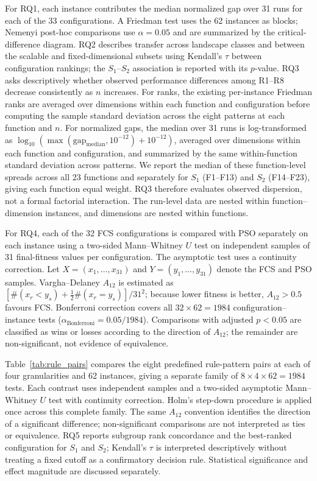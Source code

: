For RQ1, each instance contributes the median normalized gap over 31 runs for each of the 33 configurations. A Friedman test uses the 62 instances as blocks; Nemenyi post-hoc comparisons use $\alpha=0.05$ and are summarized by the critical-difference diagram. RQ2 describes transfer across landscape classes and between the scalable and fixed-dimensional subsets using Kendall's $\tau$ between configuration rankings; the $S_1$--$S_2$ association is reported with its $p$-value. RQ3 asks descriptively whether observed performance differences among R1--R8 decrease consistently as $n$ increases. For ranks, the existing per-instance Friedman ranks are averaged over dimensions within each function and configuration before computing the sample standard deviation across the eight patterns at each function and $n$. For normalized gaps, the median over 31 runs is log-transformed as $\log_{10}(\max(\text{gap}_{\mathrm{median}},10^{-12})+10^{-12})$, averaged over dimensions within each function and configuration, and summarized by the same within-function standard deviation across patterns. We report the median of these function-level spreads across all 23 functions and separately for $S_1$ (F1--F13) and $S_2$ (F14--F23), giving each function equal weight. RQ3 therefore evaluates observed dispersion, not a formal factorial interaction. The run-level data are nested within function--dimension instances, and dimensions are nested within functions.

For RQ4, each of the 32 FCS configurations is compared with PSO separately on each instance using a two-sided Mann--Whitney $U$ test on independent samples of 31 final-fitness values per configuration. The asymptotic test uses a continuity correction. Let $X=(x_1,\ldots,x_{31})$ and $Y=(y_1,\ldots,y_{31})$ denote the FCS and PSO samples. Vargha--Delaney $A_{12}$ is estimated as $\left[\#(x_r<y_s)+\tfrac12\#(x_r=y_s)\right]/31^2$; because lower fitness is better, $A_{12}>0.5$ favours FCS. Bonferroni correction covers all $32\times62=1984$ configuration--instance tests ($\alpha_{\mathrm{Bonferroni}}=0.05/1984$). Comparisons with adjusted $p<0.05$ are classified as wins or losses according to the direction of $A_{12}$; the remainder are non-significant, not evidence of equivalence.

Table~\ref{tab:rule_pairs} compares the eight predefined rule-pattern pairs at each of four granularities and 62 instances, giving a separate family of $8\times4\times62=1984$ tests. Each contrast uses independent samples and a two-sided asymptotic Mann--Whitney $U$ test with continuity correction. Holm's step-down procedure is applied once across this complete family. The same $A_{12}$ convention identifies the direction of a significant difference; non-significant comparisons are not interpreted as ties or equivalence. RQ5 reports subgroup rank concordance and the best-ranked configuration for $S_1$ and $S_2$; Kendall's $\tau$ is interpreted descriptively without treating a fixed cutoff as a confirmatory decision rule. Statistical significance and effect magnitude are discussed separately.
